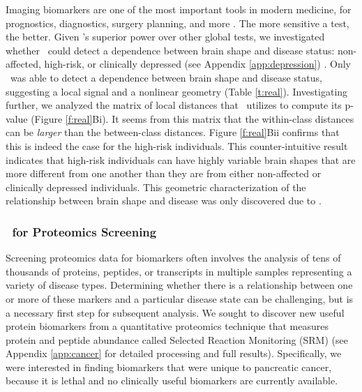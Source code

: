 \documentclass[11pt]{extarticle}
\begin{document}
Imaging biomarkers are one of the most important tools in modern medicine, for prognostics, diagnostics, surgery planning, and more \cite{Prescott2013}. The more sensitive a test, the better.  Given \Mgc's superior power over other global tests, we investigated whether \Mgc~could detect a dependence between brain shape and disease status: non-affected, high-risk, or clinically depressed (see Appendix \ref{app:depression}) \cite{ParkEtAl2008,PosenerEtAl2003}.
Only \Mgc~was able to detect a dependence between brain shape and disease status, suggesting a local signal and a nonlinear geometry (Table \ref{t:real}).  Investigating further, we analyzed the matrix of local distances that \Mgc~utilizes to compute its p-value (Figure \ref{f:real}{\color{magenta}Bi}).  It seems from this matrix that the within-class distances can be \emph{larger} than the between-class distances.  Figure \ref{f:real}{\color{magenta}Bii} confirms that this is indeed the case for the high-risk individuals.  This counter-intuitive result indicates that high-risk individuals can have highly variable brain shapes that are more different from one another than they are from either non-affected or clinically depressed individuals.  This geometric characterization of the relationship between brain shape and disease was only discovered due to \Mgc.

\subsubsection*{\Mgc~for Proteomics Screening}

Screening proteomics data for biomarkers often involves the analysis of tens of thousands of proteins, peptides, or transcripts in multiple samples representing a variety of disease types. Determining whether there is a relationship between one or more of these markers and a particular disease state can be challenging, but is a necessary first step for subsequent analysis. We sought to discover new useful protein biomarkers from a quantitative proteomics technique that measures protein and peptide abundance called Selected Reaction Monitoring (SRM) \cite{PMID21248225} (see Appendix \ref{app:cancer} for detailed processing and full results).
Specifically, we were interested in finding biomarkers that were unique to pancreatic cancer, because it is lethal and no clinically useful biomarkers are currently available.
\end{document}

